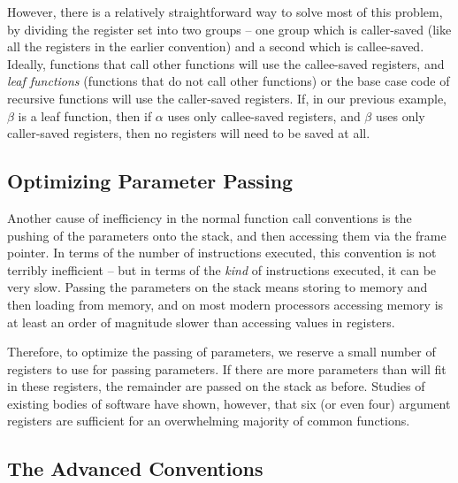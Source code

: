 However, there is a relatively straightforward way to solve most of
this problem, by dividing the register set into two groups -- one group
which is caller-saved (like all the registers in the earlier
convention) and a second which is callee-saved.  Ideally, functions
that call other functions will use the callee-saved registers, and
{\em leaf functions} (functions that do not call other functions) or
the base case code of recursive functions will use the caller-saved
registers.  If, in our previous example, $\beta$ is a leaf function,
then if $\alpha$ uses only callee-saved registers, and $\beta$ uses
only caller-saved registers, then no registers will need to be saved
at all.

\subsection{Optimizing Parameter Passing}

Another cause of inefficiency in the normal function call conventions
is the pushing of the parameters onto the stack, and then accessing them
via the frame pointer.   In terms of the number of instructions executed,
this convention is not terribly inefficient -- but in terms of the {\em kind}
of instructions executed, it can be very slow.  Passing the parameters on
the stack means storing to memory and then loading from memory, and on
most modern processors accessing memory is at least an order of magnitude 
slower than accessing values in registers.

Therefore, to optimize the passing of parameters, we reserve a small
number of registers to use for passing parameters.  If there are more
parameters than will fit in these registers, the remainder are passed
on the stack as before.  Studies of existing bodies of software have
shown, however, that six (or even four) argument registers are
sufficient for an overwhelming majority of common functions.

\subsection{The Advanced Conventions}

